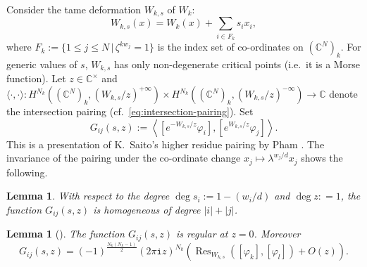 \documentclass[11pt]{amsart}
\newtheorem{lem}[thm]{Lemma} %
\theoremstyle{definition} %
\theoremstyle{remark} %
\newcommand{\CC}{\mathbb C}
\newcommand{\Res}{\operatorname{Res}}
\def\pair#1#2{\langle #1, #2\rangle}
\def\Pair#1#2{\left\langle #1, #2\right \rangle}
\newcommand{\iu}{\mathtt{i}}
\begin{document}
Consider the tame deformation $W_{k,s}$ of $W_k$: 
\[
W_{k,s}(x) = W_k(x) + \sum_{i\in F_k} s_i x_i, 
\]
where $F_k := \{1\le j\le N\,|\, \zeta^{k w_j} =1\}$ 
is the index set of co-ordinates on $(\CC^N)_k$. 
For generic values of $s$, $W_{k,s}$ has only 
non-degenerate critical points (i.e.\ it is 
a Morse function). 
Let $z\in \CC^\times$ and 
$\pair{\cdot}{\cdot} 
\colon H^{N_k}((\CC^N)_k, (W_{k,s}/z)^{+\infty}) 
\times H^{N_k}((\CC^N)_k, (W_{k,s}/z)^{-\infty}) 
\to \CC$ denote the 
intersection pairing (cf.\ \eqref{eq:intersection-pairing}).  
Set 
\[
G_{ij}(s,z):= 
\Pair{[e^{-W_{k,s}/z} \varphi_i]}{[e^{W_{k,s}/z} \varphi_j]}.  
\]
This is a presentation of 
K.~Saito's higher residue pairing \cite{SaitoK:higherresidue} 
by Pham \cite{Pham:onglet}. 
The invariance of the pairing under the co-ordinate 
change $x_j \mapsto \lambda^{w_j/d} x_j$ shows the 
following. 
\begin{lem} 
\label{lem:degree_G_ij} 
With respect to the degree $\deg s_i := 1- (w_i/d)$ and $\deg z: =1$,  
the function $G_{ij}(s,z)$ is homogeneous of 
degree $|i| + |j|$. 
\end{lem} 
\begin{lem}[] 
\label{lem:z-expansion_G_ij} 
The function $G_{ij}(s,z)$ is regular at $z=0$. Moreover 
\[
G_{ij}(s,z) = (-1)^{\frac{N_k(N_k-1)}{2}}  
(2\pi\iu z)^{N_k} 
\left( \Res_{W_{k,s}} ([\varphi_k], [\varphi_l]) 
+ O(z) \right).  
\]
\end{lem} 
\end{document}
